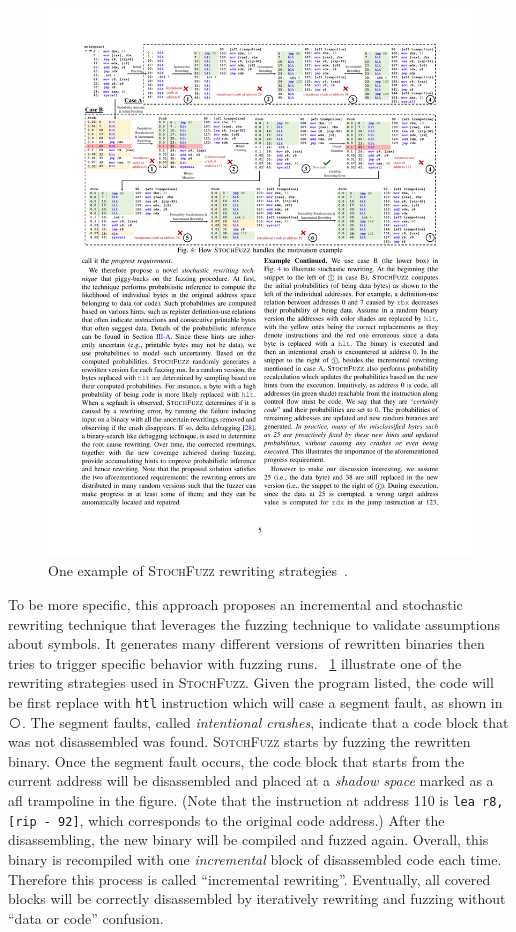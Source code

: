 \begin{figure}[tb]
  \centering
  \includegraphics[width=1.0\textwidth]{fig/STOCHFUZZ.pdf}
  \caption{One example of \textsc{StochFuzz} rewriting strategies~\cite{zhang2021stochfuzz}.}
  \label{fig:stochfuzz}
\end{figure}

To be more specific, this approach proposes an incremental and stochastic rewriting technique that leverages the fuzzing technique to validate assumptions about symbols. It generates many different versions of rewritten binaries then tries to trigger specific behavior with fuzzing runs.
%
\F~\ref{fig:stochfuzz} illustrate one of the rewriting strategies used in \textsc{StochFuzz}. Given the program listed, the code will be first replace with \texttt{htl} instruction which will case a segment fault, as shown in \textcircled{}. The segment faults, called \textit{intentional crashes}, indicate that a code block that was not disassembled was found. \textsc{SotchFuzz} starts by fuzzing the rewritten binary. Once the segment fault occurs, the code block that starts from the current address will be disassembled and placed at a \textit{shadow space} marked as a afl trampoline in the figure. (Note that the instruction at address 110 is \texttt{lea r8, [rip - 92]}, which corresponds to the original code address.) After the disassembling, the new binary will be compiled and fuzzed again. Overall, this binary is recompiled with one \textit{incremental} block of disassembled code each time. Therefore this process is called ``incremental rewriting''. Eventually, all covered blocks will be correctly disassembled by iteratively rewriting and fuzzing without ``data or code'' confusion.

